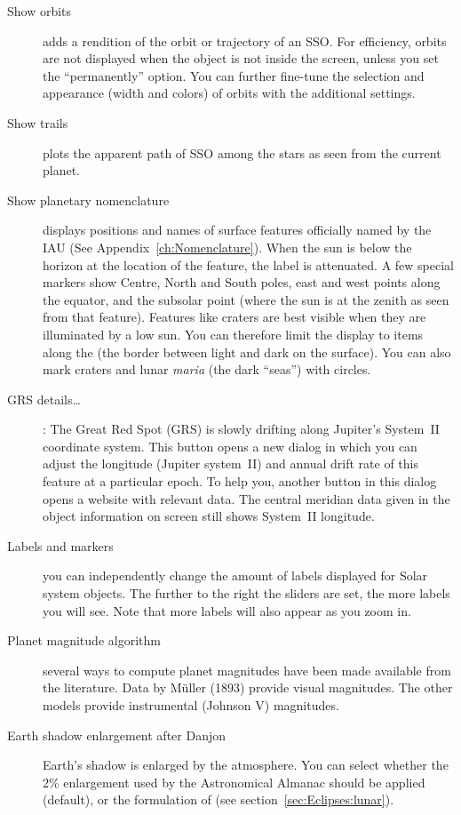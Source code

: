 \begin{description}
\item[Show orbits] adds a rendition of the orbit or trajectory of an SSO. 
For efficiency, orbits are not displayed when the object is not inside the screen, 
unless you set the ``permanently'' option. You can further fine-tune the selection 
and appearance (width and colors) of orbits with the additional settings. 
\item[Show trails] plots the apparent path of SSO among the stars as
  seen from the current planet.
\item[Show planetary nomenclature] displays positions and names of
  surface features officially named by the IAU (See
  Appendix~\ref{ch:Nomenclature}). When the sun is below the horizon
  at the location of the feature, the label is attenuated. A few special markers 
  show Centre, North and South poles, east and west points along the equator, 
  and the subsolar point (where the sun is at the zenith as seen from that feature). 
  Features like craters are best visible when they are illuminated by a low sun. 
  You can therefore limit the display to items along the
   (the border between light and dark on the surface).
  You can also mark craters and lunar \emph{maria} (the dark ``seas'') with circles. 
\item[GRS details\ldots]: The Great Red Spot (GRS) is slowly
  drifting along Jupiter's System~II coordinate system. This button 
  opens a new dialog in which you can adjust the longitude (Jupiter system~II) 
  and annual drift rate of this feature at a particular epoch. To help you,
  another button in this dialog opens a website with relevant data.
  The central meridian data given
   in the object information on screen still shows
  System~II longitude.
\item[Labels and markers] you can independently change the amount of
  labels displayed for Solar system objects. The further to the
  right the sliders are set, the more labels you will see. Note that
  more labels will also appear as you zoom in.
\item[Planet magnitude algorithm] several ways to compute planet
  magnitudes have been made available from the literature. Data by
  Müller (1893) provide visual magnitudes. The other models provide
  instrumental (Johnson V) magnitudes.
\item[Earth shadow enlargement after Danjon] 
  Earth's shadow is enlarged by the atmosphere. You can select whether
  the 2\% enlargement used by the Astronomical Almanac should be
  applied (default), or the formulation of 
  (see section~\ref{sec:Eclipses:lunar}).
\end{description}

